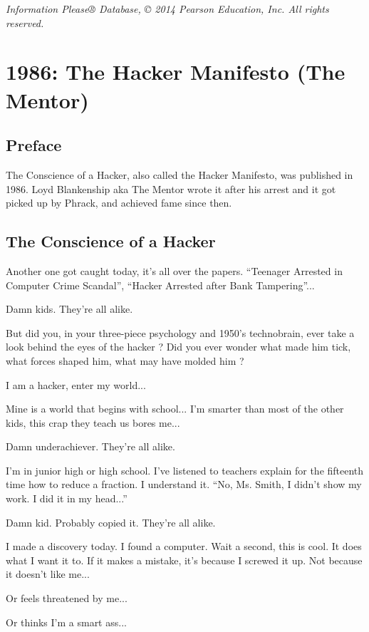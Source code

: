 \documentclass[letterpaper,12pt,english]{sphinxmanual}
\begin{document}
\emph{Information Please® Database, © 2014 Pearson Education, Inc. All rights reserved.}


\chapter{1986: The Hacker Manifesto (The Mentor)}
\label{1986:the-hacker-manifesto-the-mentor}\label{1986::doc}

\section{Preface}
\label{1986:preface}
The Conscience of a Hacker, also called the Hacker Manifesto, was published in 1986. Loyd Blankenship aka The Mentor wrote it after his arrest and it got picked up by Phrack, and achieved fame since then.


\section{The Conscience of a Hacker}
\label{1986:the-conscience-of-a-hacker}
Another one got caught today, it's all over the papers. ``Teenager Arrested in Computer Crime Scandal'', ``Hacker Arrested after Bank Tampering''...

Damn kids. They're all alike.

But did you, in your three-piece psychology and 1950's technobrain, ever take a look behind the eyes of the hacker ? Did you ever wonder what made him tick, what forces shaped him, what may have molded him ?

I am a hacker, enter my world...

Mine is a world that begins with school... I'm smarter than most of the other kids, this crap they teach us bores me...

Damn underachiever. They're all alike.

I'm in junior high or high school. I've listened to teachers explain for the fifteenth time how to reduce a fraction. I understand it. ``No, Ms. Smith, I didn't show my work. I did it in my head...''

Damn kid. Probably copied it. They're all alike.

I made a discovery today. I found a computer. Wait a second, this is cool. It does what I want it to. If it makes a mistake, it's because I screwed it up. Not because it doesn't like me...

Or feels threatened by me...

Or thinks I'm a smart ass...
\end{document}
